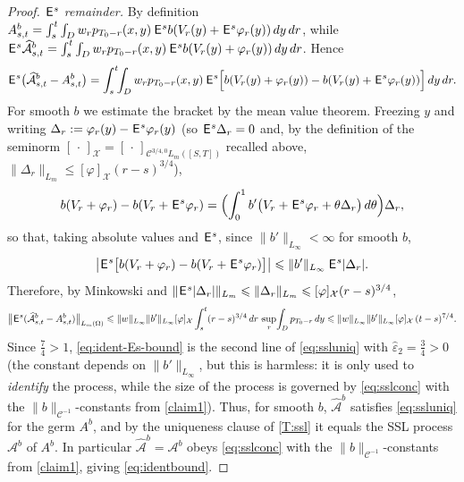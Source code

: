 \documentclass[12pt]{article}
\theoremstyle{definition}
\DeclareMathOperator{\1}{\mathbbm{1}}%
\def\E{\hskip.15ex\mathsf{E}\hskip.10ex}
\def\phi{\varphi}
\renewcommand{\le}{\leqslant}
\newcommand{\C}{\mathcal{C}}
\newcommand{\X}{\mathcal{X}}
\begin{document}
\begin{proof}
\emph{$\E^s$ remainder.} By definition $A^b_{s,t}=\int_s^t\int_D w_r p_{T_0-r}(x,y)\,
\E^s b(V_r(y)+\E^s\phi_r(y))\,dy\,dr$, while
$\E^s\widehat{\mathcal A}^b_{s,t}=\int_s^t\int_D w_r p_{T_0-r}(x,y)\,\E^s b(V_r(y)+\phi_r(y))\,dy\,dr$.
Hence
\begin{equation}\label{eq:ident-Es}
\E^s\bigl(\widehat{\mathcal A}^b_{s,t}-A^b_{s,t}\bigr)
=\int_s^t\!\!\int_D w_r p_{T_0-r}(x,y)\,\E^s\Bigl[b(V_r(y)+\phi_r(y))-b(V_r(y)+\E^s\phi_r(y))\Bigr]\,dy\,dr .
\end{equation}
For smooth $b$ we estimate the bracket by the mean value theorem. Freezing $y$ and writing
$\Delta_r:=\phi_r(y)-\E^s\phi_r(y)$ (so $\E^s\Delta_r=0$ and, by the definition of the
seminorm $[\,\cdot\,]_{\X}=[\,\cdot\,]_{\C^{3/4,0}L_m([S,T])}$ recalled above,
$\|\Delta_r\|_{L_m}\le[\phi]_{\X}(r-s)^{3/4}$),
\[
b(V_r+\phi_r)-b(V_r+\E^s\phi_r)=\Bigl(\int_0^1 b'\bigl(V_r+\E^s\phi_r+\theta\Delta_r\bigr)\,d\theta\Bigr)\Delta_r ,
\]
so that, taking absolute values and $\E^s$, since $\|b'\|_{L_\infty}<\infty$ for smooth $b$,
\[
\bigl|\E^s\bigl[b(V_r+\phi_r)-b(V_r+\E^s\phi_r)\bigr]\bigr|\le \|b'\|_{L_\infty}\,\E^s|\Delta_r| .
\]
Therefore, by Minkowski and $\|\E^s|\Delta_r|\|_{L_m}\le\|\Delta_r\|_{L_m}\le[\phi]_\X(r-s)^{3/4}$,
\begin{equation}\label{eq:ident-Es-bound}
\bigl\|\E^s(\widehat{\mathcal A}^b_{s,t}-A^b_{s,t})\bigr\|_{L_m(\Omega)}
\le \|w\|_{L_\infty}\|b'\|_{L_\infty}[\phi]_\X\int_s^t(r-s)^{3/4}\,dr\cdot\!\!\sup_{r}\!\int_D p_{T_0-r}\,dy
\le \|w\|_{L_\infty}\|b'\|_{L_\infty}[\phi]_\X\,(t-s)^{7/4}.
\end{equation}
Since $\tfrac74>1$, \eqref{eq:ident-Es-bound} is the second line of \eqref{eq:ssluniq} with
$\widehat\varepsilon_2=\tfrac34>0$ (the constant depends on $\|b'\|_{L_\infty}$, but this is
harmless: it is only used to \emph{identify} the process, while the size of the process is
governed by \eqref{eq:sslconc} with the $\|b\|_{\C^{-1}}$-constants from \eqref{claim1}).
Thus, for smooth $b$, $\widehat{\mathcal A}^b$ satisfies \eqref{eq:ssluniq} for the germ $A^b$, and by
the uniqueness clause of \cref{T:ssl} it equals the SSL process $\mathcal A^b$ of $A^b$. In
particular $\widehat{\mathcal A}^b=\mathcal A^b$ obeys \eqref{eq:sslconc} with the
$\|b\|_{\C^{-1}}$-constants from \eqref{claim1}, giving \eqref{eq:identbound}.


\end{proof}
\end{document}

